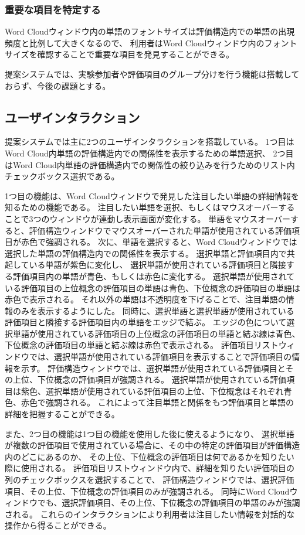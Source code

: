 \documentclass[syuuron]{kuee}
\begin{document}
			\subsubsection{重要な項目を特定する}
				Word Cloudウィンドウ内の単語のフォントサイズは評価構造内での単語の出現頻度と比例して大きくなるので、
				利用者はWord Cloudウィンドウ内のフォントサイズを確認することで重要な項目を発見することができる。
			
			提案システムでは、実験参加者や評価項目のグループ分けを行う機能は搭載しておらず、今後の課題とする。			
			
		\subsection{ユーザインタラクション}
			提案システムでは主に2つのユーザインタラクションを搭載している。
			1つ目はWord Cloud内単語の評価構造内での関係性を表示するための単語選択、
			2つ目はWord Cloud内単語の評価構造内での関係性の絞り込みを行うためのリスト内チェックボックス選択である。
			
			1つ目の機能は、Word Cloudウィンドウで発見した注目したい単語の詳細情報を知るための機能である。
			注目したい単語を選択、もしくはマウスオーバーすることで3つのウィンドウが連動し表示画面が変化する。
			単語をマウスオーバーすると、評価構造ウィンドウでマウスオーバーされた単語が使用されている評価項目が赤色で強調される。
			次に、単語を選択すると、Word Cloudウィンドウでは選択した単語の評価構造内での関係性を表示する。
			選択単語と評価項目内で共起している単語が紫色に変化し、
			選択単語が使用されている評価項目と隣接する評価項目内の単語が青色、もしくは赤色に変化する。
			選択単語が使用されている評価項目の上位概念の評価項目の単語は青色、下位概念の評価項目の単語は赤色で表示される。
			それ以外の単語は不透明度を下げることで、注目単語の情報のみを表示するようにした。
			同時に、選択単語と選択単語が使用されている評価項目と隣接する評価項目内の単語をエッジで結ぶ。
			エッジの色について選択単語が使用されている評価項目の上位概念の評価項目の単語と結ぶ線は青色、
			下位概念の評価項目の単語と結ぶ線は赤色で表示される。
			評価項目リストウィンドウでは、選択単語が使用されている評価項目を表示することで評価項目の情報を示す。
			評価構造ウィンドウでは、選択単語が使用されている評価項目とその上位、下位概念の評価項目が強調される。
			選択単語が使用されている評価項目は紫色、選択単語が使用されている評価項目の上位、下位概念はそれぞれ青色、赤色で強調される。
			これによって注目単語と関係をもつ評価項目と単語の詳細を把握することができる。
			
			また、2つ目の機能は1つ目の機能を使用した後に使えるようになり、
			選択単語が複数の評価項目で使用されている場合に、その中の特定の評価項目が評価構造内のどこにあるのか、
			その上位、下位概念の評価項目は何であるかを知りたい際に使用される。
			評価項目リストウィンドウ内で、詳細を知りたい評価項目の列のチェックボックスを選択することで、
			評価構造ウィンドウでは、選択評価項目、その上位、下位概念の評価項目のみが強調される。
			同時にWord Cloudウィンドウでも、選択評価項目、その上位、下位概念の評価項目の単語のみが強調される。
			これらのインタラクションにより利用者は注目したい情報を対話的な操作から得ることができる。
			
\end{document}
